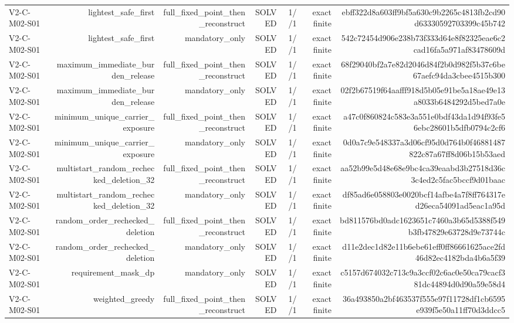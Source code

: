 {\begin{longtable}{lrrrrrr}
V2-C-M02-S01 & lightest\_safe\_first & full\_fixed\_point\_then\_reconstruct & SOLVED & 1//1 & exact finite & ebff322d8a603ff9bf5a630c9b2265c4813fb2cd90d63330592703399c45b742 \\
V2-C-M02-S01 & lightest\_safe\_first & mandatory\_only & SOLVED & 1//1 & exact finite & 542c72454d906e238b73f333d64e8f82325eae6c2cad16fa5a971af83478609d \\
V2-C-M02-S01 & maximum\_immediate\_burden\_release & full\_fixed\_point\_then\_reconstruct & SOLVED & 1//1 & exact finite & 68f29040bf2a7e82d2046d84f2b0d982f5b37c6be67aefc94da3cbee4515b300 \\
V2-C-M02-S01 & maximum\_immediate\_burden\_release & mandatory\_only & SOLVED & 1//1 & exact finite & 02f2b67519f64aafff918d5b05e91be5a18ae49e13a8033b6484292d5bed7a0e \\
V2-C-M02-S01 & minimum\_unique\_carrier\_exposure & full\_fixed\_point\_then\_reconstruct & SOLVED & 1//1 & exact finite & a47c0f860824c583e3a551e0bdf43da1d94f93fe56ebc28601b5dfb0794c2cf6 \\
V2-C-M02-S01 & minimum\_unique\_carrier\_exposure & mandatory\_only & SOLVED & 1//1 & exact finite & 0d0a7c9e548337a3d06cf95d0d764b0f46881487822c87a67ff8d06b15b53aed \\
V2-C-M02-S01 & multistart\_random\_rechecked\_deletion\_32 & full\_fixed\_point\_then\_reconstruct & SOLVED & 1//1 & exact finite & aa52b99e5d48e68e9bc4ca39eaabd3b27518d36c3c4ed2c5fac5bccf9d01baac \\
V2-C-M02-S01 & multistart\_random\_rechecked\_deletion\_32 & mandatory\_only & SOLVED & 1//1 & exact finite & df85ad6e058803e0020bcf14afbe4a7f8ff764317ed26eca54091ad5eac1a95d \\
V2-C-M02-S01 & random\_order\_rechecked\_deletion & full\_fixed\_point\_then\_reconstruct & SOLVED & 1//1 & exact finite & bd811576bd0adc1623651c7460a3b65d5388f549b3fb47829e63728d9e73744c \\
V2-C-M02-S01 & random\_order\_rechecked\_deletion & mandatory\_only & SOLVED & 1//1 & exact finite & d11e2dec1d82e11b6ebe61eff0ff86661625ace2fd46d82ec4182bda4b6a5f39 \\
V2-C-M02-S01 & requirement\_mask\_dp & mandatory\_only & SOLVED & 1//1 & exact finite & c5157d674032c713c9a3ccf02c6ac0e50ca79cacf381dc44894d0d90a59e58d4 \\
V2-C-M02-S01 & weighted\_greedy & full\_fixed\_point\_then\_reconstruct & SOLVED & 1//1 & exact finite & 36a493850a2bf463537f555e97f11728df1cb6595e939f5e50a11ff70d3ddcc5 \\

\end{longtable}}
